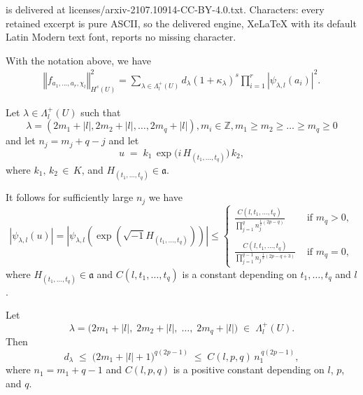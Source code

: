 \documentclass[10pt,a4paper]{amsart}
\begin{document}
is delivered at licenses/arxiv-2107.10914-CC-BY-4.0.txt. Characters: every retained excerpt is pure ASCII, so the delivered engine, XeLaTeX with its default Latin Modern text font, reports no missing character.
\begin{proposition}\label{Sobloev norm estimation}
With the notation above, we have
	\begin{align*}
	\left\Vert  f_{a_{1},...,a_{r},\chi_l}\right\Vert _{H^{s}\left(U\right)}^{2}%
	=\sum\limits_{\lambda\in \Lambda_l^+\left(U \right)
		}d_\lambda\left(  1+\kappa_\lambda\right)  ^{s}\prod\limits_{i=1}^{r}\left\vert
	\psi_{\lambda,l}\left(a_i\right)  \right\vert ^{2}. 
\end{align*}		
\end{proposition} 

\begin{corollary}
 \label{estimation}

Let  $ \lambda\in \Lambda_l^+\left(U \right)$ such that  $$ \lambda= ( 2m_1+|l|, 2m_2+|l| , \dots , 2 m_q+|l|), m_i\in \mathbb{Z} , m_1\geq m_2 \geq \dots \geq m_q\geq 0$$  and let $n_j=m_j+q-j$ and let
\[
u \;=\; k_1\,\exp\!\bigl(i\,H_{\left(t_{1},...,t_{q}\right)}\bigr)\,k_2,
\]
 where 
\(k_1, \,  k_2 \,\in\, K\),  and  \(H_{\left(t_{1},...,t_{q}\right)}\in \mathfrak{a}\).

It follows  for sufficiently large $n_j$ we have 
\[	
\left\vert \psi_{{\lambda,l}}\left(u
  \right)\right\vert= \left\vert \psi_{{\lambda,l}}\left(\exp\left(\sqrt{-1}H_{\left(t_{1},...,t_{q}\right)}
\right)  \right)\right\vert \leq \begin{cases}
   \frac{C\left(l, t_1, \dots, t_q \right) }{ {\prod\limits_{j=1}^{q}} n_j^{\frac{1}{2}(2p-q)}  }&\mbox{ if } m_q>0,  \\\\  \frac{C\left(l, t_1, \dots, t_q \right)}{{\prod\limits_{j=1}^{q-1}}{n_{j}}^{\frac{1}{2} (2p-q+3)}} &\mbox{ if }  m_q=0,
 \end{cases}
 \]
where $H_{(t_1,\dots,t_q)}\in \mathfrak{a}$ and  $C\left(l, t_1, \dots, t_q \right) $ is a constant depending on $t_1, \dots, t_q$ and $l$.
\end{corollary}

\begin{corollary} \label{dimention 1}Let 
\[
\lambda 
= \bigl(2m_1 + |l|,\; 2m_2 + |l|,\; \dots,\; 2m_q + |l|\bigr) 
\;\in\; \Lambda_l^+ (U).
\]
Then  
\[
d_\lambda \;\le\; \bigl(2m_1 + |l| + 1\bigr)^{q(2p-1)}\;\le\; C\left(l,p,q\right)\, n_1^{\,q(2p-1)},
\]
where \(n_1 = m_1 + q - 1\) and \(C\left(l,p,q\right)\) is a positive constant depending on \(l\), \(p\), and \(q\).

\end{corollary}
\end{document}
